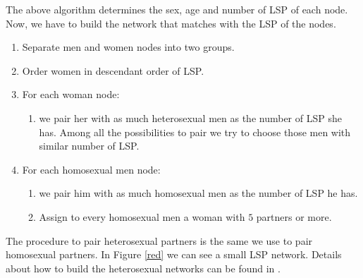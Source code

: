 The above algorithm determines the sex, age and number of LSP of each node. Now, we have to build the network that matches with the LSP of the nodes. 

\begin{enumerate}
	\item Separate men and women nodes into two groups.
	\item Order women in descendant order of LSP.
	\item For each woman node:
	\begin{enumerate}
		\item we pair her with as much heterosexual men as the number of LSP she has. Among all the possibilities to pair we try to choose those men with similar number of LSP. 
	\end{enumerate} 
	\item For each homosexual men node:
	\begin{enumerate}
		\item we pair him with as much homosexual men as the number of LSP he has.
		\item Assign to every homosexual men a woman with $5$ partners or more. 
	\end{enumerate} 
\end{enumerate}

The procedure to pair heterosexual partners is the same we use to pair homosexual partners. In Figure \ref{red} we can see a small LSP network. Details about how to build the heterosexual networks can be found in \cite{NOVA_LSP}. 

